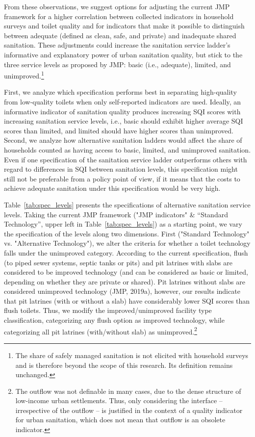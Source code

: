 \documentclass[natbib]{svjour3}                     %
\begin{document}
From these observations, we suggest options for adjusting the current JMP framework for a higher correlation between collected indicators in household surveys and toilet quality and for indicators that make it possible to distinguish between adequate (defined as clean, safe, and private) and inadequate shared sanitation. These adjustments could increase the sanitation service ladder’s informative and explanatory power of urban sanitation quality, but stick to the three service levels as proposed by JMP: basic (i.e., adequate), limited, and unimproved.\footnote{The share of safely managed sanitation is not elicited with household surveys and is therefore beyond the scope of this research. Its definition remains unchanged.}

First, we analyze which specification performs best in separating high-quality from low-quality toilets when only self-reported indicators are used. Ideally, an informative indicator of sanitation quality produces increasing SQI scores with increasing sanitation service levels, i.e., basic should exhibit higher average SQI scores than limited, and limited should have higher scores than unimproved. Second, we analyze how alternative sanitation ladders would affect the share of households counted as having access to basic, limited, and unimproved sanitation. Even if one specification of the sanitation service ladder outperforms others with regard to differences in SQI between sanitation levels, this specification might still not be preferable from a policy point of view, if it means that the costs to achieve adequate sanitation under this specification would be very high.

Table~\ref{tab:spec_levels} presents the specifications of alternative sanitation service levels. Taking the current JMP framework ("JMP indicators" \& “Standard Technology”, upper left in Table~\ref{tab:spec_levels}) as a starting point, we vary the specification of the levels along two dimensions. First ("Standard Technology" vs. "Alternative Technology"), we alter the criteria for whether a toilet technology falls under the unimproved category. According to the current specification, flush (to piped sewer systems, septic tanks or pits) and pit latrines with slabs are considered to be improved technology (and can be considered as basic or limited, depending on whether they are private or shared). Pit latrines without slabs are considered unimproved technology (JMP, 2019a), however, our results indicate that pit latrines (with or without a slab) have considerably lower SQI scores than flush toilets. Thus, we modify the improved/unimproved facility type classification, categorizing any flush option as improved technology, while categorizing all pit latrines (with/without slab) as unimproved.\footnote{The outflow was not definable in many cases, due to the dense structure of low-income urban settlements. Thus, only considering the interface -- irrespective of the outflow -- is justified in the context of a quality indicator for urban sanitation, which does not mean that outflow is an obsolete indicator.} 
\end{document}

